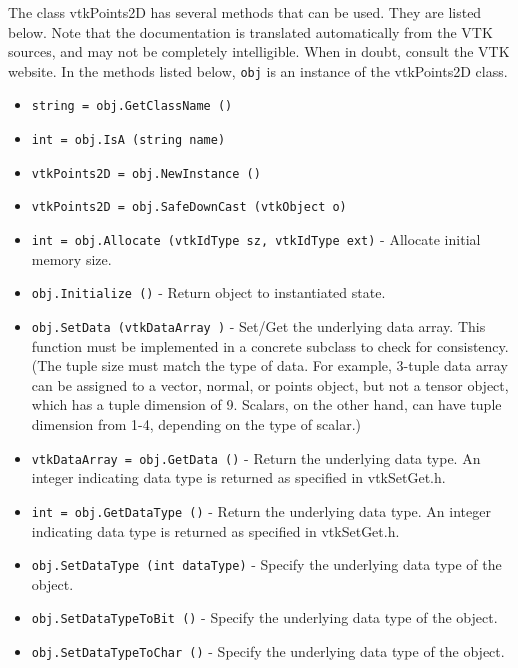 The class vtkPoints2D has several methods that can be used.
  They are listed below.
Note that the documentation is translated automatically from the VTK sources,
and may not be completely intelligible.  When in doubt, consult the VTK website.
In the methods listed below, \verb|obj| is an instance of the vtkPoints2D class.
\begin{itemize}
\item  \verb|string = obj.GetClassName ()|

\item  \verb|int = obj.IsA (string name)|

\item  \verb|vtkPoints2D = obj.NewInstance ()|

\item  \verb|vtkPoints2D = obj.SafeDownCast (vtkObject o)|

\item  \verb|int = obj.Allocate (vtkIdType sz, vtkIdType ext)| -  Allocate initial memory size.

\item  \verb|obj.Initialize ()| -  Return object to instantiated state.

\item  \verb|obj.SetData (vtkDataArray )| -  Set/Get the underlying data array. This function must be implemented
 in a concrete subclass to check for consistency. (The tuple size must
 match the type of data. For example, 3-tuple data array can be assigned to
 a vector, normal, or points object, but not a tensor object, which has a
 tuple dimension of 9. Scalars, on the other hand, can have tuple dimension
  from 1-4, depending on the type of scalar.)

\item  \verb|vtkDataArray = obj.GetData ()| -  Return the underlying data type. An integer indicating data type is
 returned as specified in vtkSetGet.h.

\item  \verb|int = obj.GetDataType ()| -  Return the underlying data type. An integer indicating data type is
 returned as specified in vtkSetGet.h.

\item  \verb|obj.SetDataType (int dataType)| -  Specify the underlying data type of the object.

\item  \verb|obj.SetDataTypeToBit ()| -  Specify the underlying data type of the object.

\item  \verb|obj.SetDataTypeToChar ()| -  Specify the underlying data type of the object.


\end{itemize}
